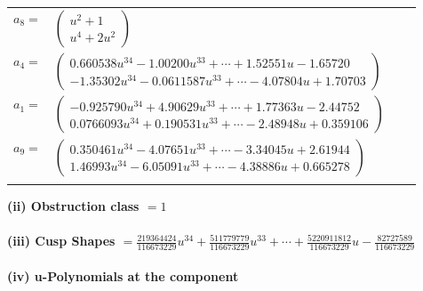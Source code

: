 \documentclass[1p]{elsarticle_modified}
\theoremstyle{definition}
\begin{document}
\begin{tabular}{m{7pt} m{180pt} m{7pt} m{180pt} }
\flushright $a_{8}=$&$\begin{pmatrix}u^2+1\\u^4+2 u^2\end{pmatrix}$ \\
\flushright $a_{4}=$&$\begin{pmatrix}0.660538 u^{34}-1.00200 u^{33}+\cdots+1.52551 u-1.65720\\-1.35302 u^{34}-0.0611587 u^{33}+\cdots-4.07804 u+1.70703\end{pmatrix}$ \\
\flushright $a_{1}=$&$\begin{pmatrix}-0.925790 u^{34}+4.90629 u^{33}+\cdots+1.77363 u-2.44752\\0.0766093 u^{34}+0.190531 u^{33}+\cdots-2.48948 u+0.359106\end{pmatrix}$ \\
\flushright $a_{9}=$&$\begin{pmatrix}0.350461 u^{34}-4.07651 u^{33}+\cdots-3.34045 u+2.61944\\1.46993 u^{34}-6.05091 u^{33}+\cdots-4.38886 u+0.665278\end{pmatrix}$\\&\end{tabular}
\flushleft \textbf{(ii) Obstruction class $= 1$}\\~\\
\flushleft \textbf{(iii) Cusp Shapes $= \frac{219364424}{116673229} u^{34}+\frac{511779779}{116673229} u^{33}+\cdots+\frac{5220911812}{116673229} u-\frac{82727589}{116673229}$}\\~\\
\newpage\renewcommand{\arraystretch}{1}
\flushleft \textbf{(iv) u-Polynomials at the component}\newline \\
\end{document}
